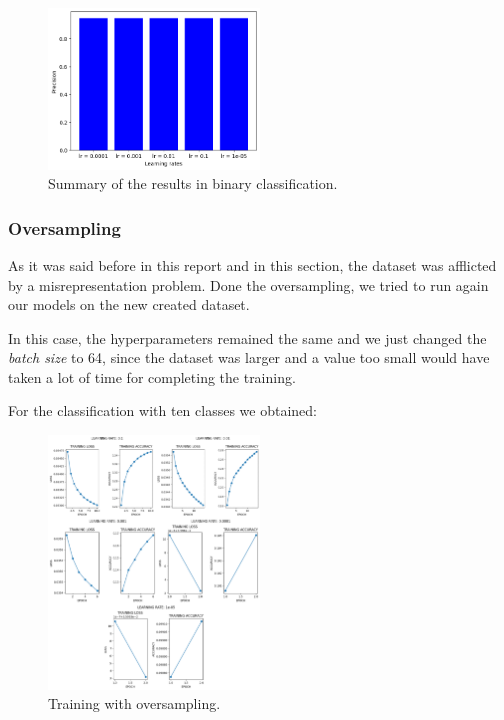 \documentclass{article}
\begin{document}
\begin{figure}[h!]
    \centering
    \includegraphics[width=0.5\textwidth]{binary_results.png}
    \caption{\label{fig:binary_summary}Summary of the results in binary classification.}
\end{figure}

\subsubsection{Oversampling}

As it was said before in this report and in this section, the dataset was afflicted by a misrepresentation problem. Done the oversampling, we 
tried to run again our models on the new created dataset.

In this case, the hyperparameters remained the same and we just changed the \emph{batch size} to 64, since the dataset was larger and a value
too small would have taken a lot of time for completing the training.

For the classification with ten classes we obtained:

\begin{figure}[h!]
    \centering
    \includegraphics[width=0.5\textwidth]{nn_oversampling.png}
    \caption{\label{fig:train_oversampling}Training with oversampling.}
\end{figure}
\end{document}
